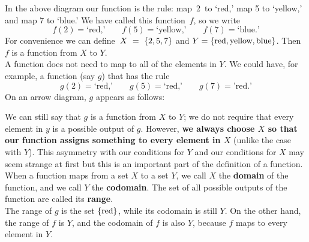 \noindent In the above diagram our function is the rule: map~2~to `red,' map 5 to `yellow,' and map 7 to `blue.' We have called this function~$f$, so we write
\[
f(2) = \text{`red,'} \qquad f(5) = \text{`yellow,'} \qquad f(7) = \text{`blue.'}
\]
For convenience we can define~$X~=~\left\{2,5,7\right\}$ and $Y = \left\{\text{red},\text{yellow},\text{blue}\right\}$. Then $f$ is a function from $X$ to $Y$. \\

\noindent A function does not need to map to all of the elements in $Y$. We could have, for example, a function (say $g$) that has the rule 
\[
g(2) = \text{`red,'} \qquad g(5) = \text{`red,'} \qquad g(7) =  \text{'red.'} 
\]
On an arrow diagram, $g$ appears as follows:
\begin{center}
\end{center}

\noindent We can still say that $g$ is a function from $X$ to $Y$; we do not require that every element in $y$ is a possible output of $g$. However, \textbf{we always choose $X$ so that our function assigns something to every element in $X$} (unlike the case with $Y$). This asymmetry with our conditions for $Y$ and our conditions for $X$ may seem strange at first but this is an important part of the definition of a function. \\

\noindent When a function maps from a set $X$ to a set $Y$, we call $X$ the \textbf{domain} \label{domain} of the function, and we call $Y$ the \textbf{codomain}. The set of all possible outputs of the function are called its \textbf{range}. \\

\noindent The range of $g$ is the set $\left\{\text{red}\right\}$, while its codomain is still $Y$. On the other hand, the range of $f$ is $Y$, and the codomain of $f$ is also $Y$, because $f$ maps to every element in $Y$. \\

